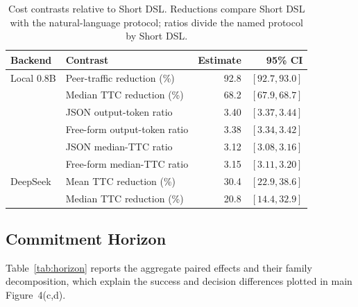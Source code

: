 \documentclass[sigconf,nonacm,balance=false]{aamas}
\newcommand{\tabstyle}{\small\setlength{\tabcolsep}{3pt}\renewcommand{\arraystretch}{1.10}}
\begin{document}
\begin{table}[!htbp]
\centering\tabstyle
\caption{Cost contrasts relative to Short DSL. Reductions compare Short DSL with the natural-language protocol; ratios divide the named protocol by Short DSL.}
\label{tab:cost-bootstrap}
\begin{tabular}{@{}llrr@{}}
\toprule
Backend & Contrast & Estimate & 95\% CI\\\midrule
Local 0.8B & Peer-traffic reduction (\%) & 92.8 & $[92.7,93.0]$\\
 & Median TTC reduction (\%) & 68.2 & $[67.9,68.7]$\\
 & JSON output-token ratio & 3.40 & $[3.37,3.44]$\\
 & Free-form output-token ratio & 3.38 & $[3.34,3.42]$\\
 & JSON median-TTC ratio & 3.12 & $[3.08,3.16]$\\
 & Free-form median-TTC ratio & 3.15 & $[3.11,3.20]$\\\addlinespace
DeepSeek & Mean TTC reduction (\%) & 30.4 & $[22.9,38.6]$\\
 & Median TTC reduction (\%) & 20.8 & $[14.4,32.9]$\\
\bottomrule
\end{tabular}
\end{table}

\subsection{Commitment Horizon}
\label{sec:supp-horizon}

Table~\ref{tab:horizon} reports the aggregate paired effects and their family decomposition, which explain the success and decision differences plotted in main Figure~4(c,d).
\end{document}
